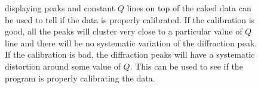 \begin{figure}[htb]
    \caption{displaying peaks and constant $Q$ lines on top of the 
    caked data can be used to tell if the data is properly calibrated. 
    If the calibration is good, all the peaks will cluster very close to
    a particular value of $Q$ line and 
    there will be no systematic variation of the diffraction peak. If 
    the calibration is bad, the diffraction peaks will have a systematic 
    distortion around some value of $Q$. This can be used to see if 
    the program is properly calibrating the data.}
    \label{calibration_cake}
\end{figure}


